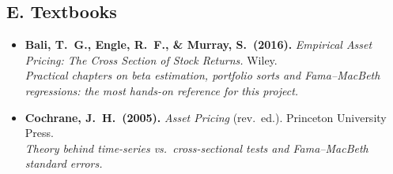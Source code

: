 \documentclass[11pt]{article}
\begin{document}
\subsection*{E. Textbooks}
\begin{itemize}
  \item \textbf{Bali, T.\ G., Engle, R.\ F., \& Murray, S.\ (2016).} \emph{Empirical Asset Pricing: The Cross Section of Stock Returns.} Wiley.\\
  \textit{Practical chapters on beta estimation, portfolio sorts and Fama--MacBeth regressions: the most hands-on reference for this project.}
  \item \textbf{Cochrane, J.\ H.\ (2005).} \emph{Asset Pricing} (rev.\ ed.). Princeton University Press.\\
  \textit{Theory behind time-series vs.\ cross-sectional tests and Fama--MacBeth standard errors.}
\end{itemize}
\end{document}
